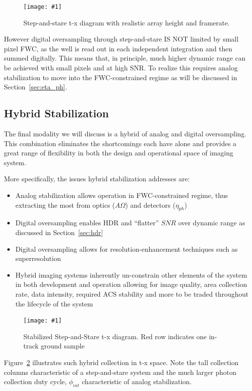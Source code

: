 \documentclass[10pt,journal]{IEEEtran}  %
\newcommand{\includefigure}[3]
{
  \begin{figure}[h!]
  \centering
  \texttt{[image: \#1]}
  \caption[]{#3}
  \label{#2}
  \end{figure}
}
\begin{document}
\includefigure{figures/step_stare_real.pgf}{fig:step_stare_real}{Step-and-stare t-x diagram with realistic array height and framerate.}

However digital oversampling through step-and-stare IS NOT limited by small pixel FWC, as the well is read out in each independent integration and then summed digitally.  This means that, in principle, much higher dynamic range can be achieved with small pixels and at high SNR.  To realize this requires analog stabilization to move into the FWC-constrained regime as will be discussed in Section~\ref{sec:eta_ph}.

\subsection{Hybrid Stabilization}

The final modality we will discuss is a hybrid of analog and digital oversampling.  This combination eliminates the shortcomings each have alone and provides a great range of flexibility in both the design and operational space of imaging system.

More specifically, the issues hybrid stabilization addresses are:

\begin{itemize}
    \item Analog stabilization allows operation in FWC-constrained regime, thus extracting the most from optics ($A\Omega$) and detectors ($\eta_{ph}$)
    \item Digital oversampling enables HDR and ``flatter'' $SNR$ over dynamic range as discussed in Section~\ref{sec:hdr}
    \item Digital oversampling allows for resolution-enhancement techniques such as superresolution
    \item Hybrid imaging systems inherently un-constrain other elements of the system in both development and operation allowing for image quality, area collection rate, data intensity, required ACS stability and more to be traded throughout the lifecycle of the system
\end{itemize}

\includefigure{figures/stab_step_stare.pgf}{fig:stab_step_stare}{Stabilized Step-and-Stare t-x diagram.  Red row indicates one in-track ground sample}

Figure~\ref{fig:stab_step_stare} illustrates such hybrid collection in t-x space.  Note the tall collection columns characteristic of a step-and-stare system and the much larger photon collection duty cycle, $\phi_{int}$ characteristic of analog stabilization.  
\end{document}
